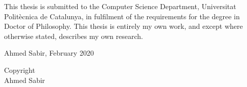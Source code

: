\begin{dedication}



This thesis is submitted to the Computer Science Department, Universitat Polit\`ecnica de Catalunya, in fulfilment of the requirements  for the degree in Doctor of Philosophy. This thesis is entirely my own  work, and except where otherwise stated, describes my own research. 


\begin{center}
    

Ahmed Sabir, February 2020 
\end{center}

\begin{center}
    

\vspace*{\fill}%

Copyright \textcopyright {} \\
 Ahmed Sabir

\end{center}









\end{dedication}



